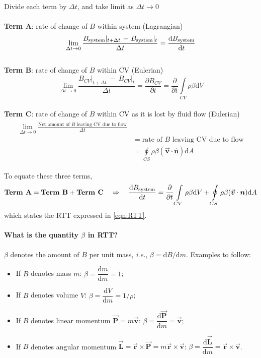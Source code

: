 \documentclass[12pt, a4paper]{article}
\numberwithin{equation}{subsection}
\begin{document}
\begin{tcolorbox}[breakable, title = \textbf{Derivation of RTT}]
Divide each term by $\Delta t$, and take limit as $\Delta t \to 0$\\
\\ \textbf{Term A}: rate of change of $B$ within system (Lagrangian)
\[ 
    \lim_{\Delta t \to 0}\frac{B_{\rm system} \lvert_{t + \Delta t} \ -\ B_{\rm system} \lvert_{t}}{\Delta t} = \frac{\mathrm{d}B_{\rm system}}{\mathrm{d}t} 
\]
\\ 
\textbf{Term B}: rate of change of $B$ within CV (Eulerian)
\[
    \lim_{\Delta t \to 0} \frac{B_{CV} \lvert_{t + \Delta t} \ -\  B_{CV}  \lvert_{t}}{\Delta t} = \frac{\partial B_{CV}}{\partial t} = \frac{\partial}{\partial t} \int\limits_{CV} \rho \beta \mathrm{d}V
\]
 \\ 
\textbf{Term C}: rate of change of $B$ within CV as it is lost by fluid flow (Eulerian)
\begin{align*} 
\begin{split}
    \lim_{\Delta t \to 0} \frac{\text{Net amount of $B$ leaving CV due to flow}}{\Delta t} \\
    & = \text{rate of $B$ leaving CV due to flow}\\
    & = \oint\limits_{CS} \rho \beta (\vec{\bm{v}} \cdot \bm{\hat{n}})\mathrm{d}A 
\end{split}
\end{align*}

To equate these three terms,
\[
    \textbf{Term A} = \textbf{Term B} + \textbf{Term C}
    \quad \Rightarrow \quad
    \frac{\mathrm{d}B_{\rm system}}{\mathrm{d}t} 
    = \frac{\partial}{\partial t} \int\limits_{CV} \rho \beta \mathrm{d}V 
    + \oint\limits_{CS} \rho \beta (\vec{\bm{v}} \cdot \bm{n})\mathrm{d}A 
\]
which states the RTT expressed in \autoref{eqn:RTT}.
\end{tcolorbox}

\paragraph{What is the quantity $\beta$ in RTT?} $\beta$ denotes the amount of $B$ per unit mass, \textit{i.e.}, $\beta = \mathrm{d} B/ \mathrm{d} m$. Examples to follow:
\begin{itemize}
    \item If $B$ denotes mass $m$: $\beta = \dfrac{\mathrm{d}m}{\mathrm{d}m} = 1$;

    \item If $B$ denotes volume $V$: $\beta = \dfrac{\mathrm{d}V}{\mathrm{d}m} = 1/\rho$;

    \item  If $B$ denotes linear momentum $\vec{\bm{P}} = m \vec{\bm{v}}$: $\beta = \dfrac{\mathrm{d} \vec{\bm{P}}}{\mathrm{d}m} = \vec{\bm{v}}$;

    \item If $B$ denotes angular momentum $\vec{\bm{L}} = \vec{\bm{r}} \times \vec{\bm{P}} = m \vec{\bm{r}} \times \vec{\bm{v}}$: $\beta = \dfrac{\mathrm{d} \vec{\bm{L}}}{\mathrm{d}m} = \vec{\bm{r}} \times \vec{\bm{v}}$.
\end{itemize}
\end{document}
